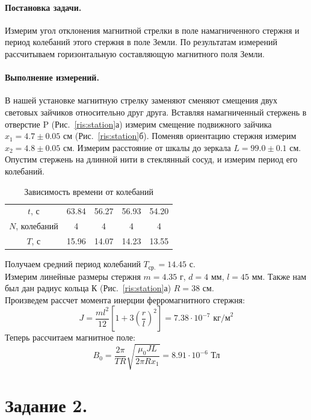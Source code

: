 \documentclass[a4paper, 12pt]{article}
\begin{document}
\paragraph{Постановка задачи.} Измерим угол отклонения магнитной стрелки в поле намагниченного стержня и период колебаний этого стержня в поле Земли. По результатам измерений рассчитываем горизонтальную составляющую магнитного поля Земли.
\paragraph{Выполнение измерений.} В нашей установке магнитную стрелку заменяют сменяют смещения двух световых зайчиков относительно друг друга. Вставляя намагниченный стержень в отверстие P (Рис.~\ref{ris:station}а) измерим смещение подвижного зайчика $x_1=4.7\pm0.05$ см (Рис.~\ref{ris:station}б). Поменяв ориентацию стержня измерим $x_2=4.8\pm0.05$ см. Измерим расстояние от шкалы до зеркала $L=99.0\pm0.1$ см.\\
Опустим стержень на длинной нити в стеклянный сосуд, и измерим период его колебаний.
\begin{table}[H]
	\centering
	\caption{Зависимость времени от колебаний}
	\begin{tabular}{c|cccc}
		\toprule
		$t$, с & 63.84 &  56.27 & 56.93 & 54.20    \\
		$N$, колебаний & 4 & 4 & 4 &  4      \\ \midrule
		$T$, с & 15.96 & 14.07 & 14.23 & 13.55 \\ \bottomrule
	\end{tabular}
\end{table}
Получаем средний период колебаний $T_\text{ср.} = 14.45\text{ с}$.\\
Измерим линейные размеры стержня $m = 4.35\text{ г}$, $d=4\text{ мм}$, $l=45\text{ мм}$. Также нам был дан радиус кольца К (Рис.~\ref{ris:station}а) $R=38\text{ см}$.\\ 
Произведем рассчет момента инерции ферромагнитного стержня: $$J=\dfrac{ml^2}{12}\left[1+3\left(\dfrac{r}{l}\right)^2\right]=7.38 \cdot 10^{-7}\text{ кг/м}^2$$ Теперь рассчитаем магнитное поле: $$B_0=\dfrac{2\pi}{TR}\sqrt{\dfrac{\mu_0JL}{2\pi Rx_1}}=8.91\cdot 10^{-6} \text{ Тл}$$
 
\section*{Задание 2.}
\end{document}
